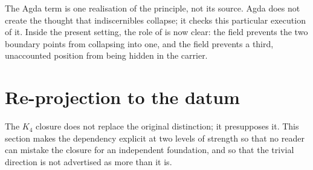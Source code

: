 \documentclass[11pt]{article}
\begin{document}
\begin{code}%
\>[0]\<%
\\
\>[0]\AgdaSpace{}%
\AgdaSymbol{:}\<%
\\
\>[0][@{}l@{\AgdaIndent{0}}]%
\>[2]\AgdaSymbol{\{}\AgdaSpace{}%
\AgdaSymbol{:}\AgdaSpace{}%
\AgdaSymbol{\}}\AgdaSpace{}%
\AgdaSymbol{(}\AgdaSpace{}%
\AgdaSpace{}%
\AgdaSymbol{:}\AgdaSpace{}%
\AgdaSymbol{)}\AgdaSpace{}%
\<%
\\
%
\>[2]\AgdaSymbol{((}\AgdaSpace{}%
\AgdaSymbol{:}\AgdaSpace{}%
\AgdaSpace{}%
\AgdaSpace{}%
\AgdaSymbol{)}\AgdaSpace{}%
\AgdaSpace{}%
\AgdaSpace{}%
\AgdaSpace{}%
\AgdaSpace{}%
\AgdaSpace{}%
\AgdaSymbol{)}\AgdaSpace{}%
\<%
\\
%
\>[2]\AgdaSpace{}%
\AgdaSpace{}%
\<%
\\
\>[0]\AgdaSpace{}%
\AgdaSpace{}%
\AgdaSpace{}%
\AgdaSpace{}%
\AgdaSymbol{=}\AgdaSpace{}%
\AgdaSpace{}%
\AgdaSpace{}%
\AgdaSpace{}%
\AgdaSpace{}%
\AgdaSpace{}%
\AgdaSpace{}%
\AgdaSymbol{)}\AgdaSpace{}%
\<%
\end{code}

The Agda term is one realisation of the principle, not its source.
Agda does not create the thought that indiscernibles collapse; it
checks this particular execution of it.  Inside the present setting,
the role of  is now clear: the
 field prevents the two boundary points from
collapsing into one, and the  field prevents a third,
unaccounted position from being hidden in the carrier.

\section{Re-projection to the datum}

The $K_4$ closure does not replace the original distinction; it
presupposes it.  This section makes the dependency explicit at two
levels of strength so that no reader can mistake the closure for an
independent foundation, and so that the trivial direction is not
advertised as more than it is.
\end{document}
